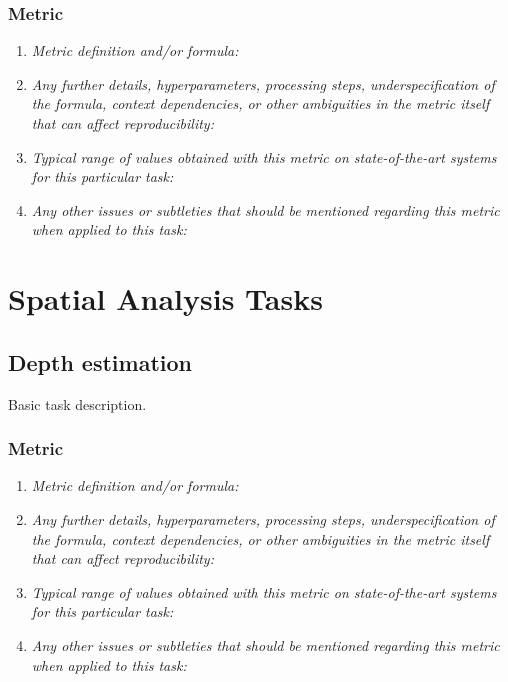 \documentclass[a4paper,11pt]{article}
\begin{document}
    \subsubsection{Metric}
        \begin{enumerate}[label=\alph*.]
            \item \textit{Metric definition and/or formula:}
            \bigskip
            \item \textit{Any further details, hyperparameters, processing steps, underspecification of the formula, context dependencies, or other ambiguities in the metric itself that can affect reproducibility:}
            \bigskip
            \item \textit{Typical range of values obtained with this metric on state-of-the-art systems for this particular task:}
            \bigskip
            \item \textit{Any other issues or subtleties that should be mentioned regarding this metric when applied to this task:}
            \bigskip
        \end{enumerate}

\clearpage
\section{Spatial Analysis Tasks}
    \subsection{Depth estimation} \label{depth_estimation}
        Basic task description.
        \subsubsection{Metric}
            \begin{enumerate}[label=\alph*.]
                \item \textit{Metric definition and/or formula:}
                \bigskip
                \item \textit{Any further details, hyperparameters, processing steps, underspecification of the formula, context dependencies, or other ambiguities in the metric itself that can affect reproducibility:}
                \bigskip
                \item \textit{Typical range of values obtained with this metric on state-of-the-art systems for this particular task:}
                \bigskip
                \item \textit{Any other issues or subtleties that should be mentioned regarding this metric when applied to this task:}
                \bigskip
            \end{enumerate}
\end{document}
